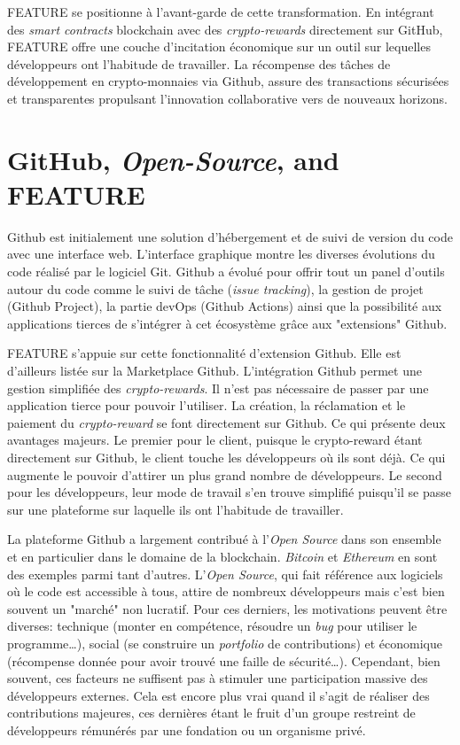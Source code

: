 \documentclass[
	a4paper, %
	10pt, %
	unnumberedsections, %
	twoside, %
]{LTJournalArticle}
\begin{document}
FEATURE se positionne à l'avant-garde de cette transformation. En intégrant des \emph{smart contracts} blockchain avec des \emph{crypto-rewards} directement sur GitHub, FEATURE offre une couche d'incitation économique sur un outil sur lequelles développeurs ont l'habitude de travailler. La récompense des tâches de développement en crypto-monnaies via Github, assure des transactions sécurisées et transparentes propulsant l'innovation collaborative vers de nouveaux horizons.


\section{GitHub, \emph{Open-Source}, and FEATURE}

Github est initialement une solution d'hébergement et de suivi de version du code avec une interface web. L'interface graphique montre les diverses évolutions du code réalisé par le logiciel Git. Github a évolué pour offrir tout un panel d'outils autour du code comme le suivi de tâche (\emph{issue tracking}), la gestion de projet (Github Project), la partie devOps (Github Actions) ainsi que la possibilité aux applications tierces de s'intégrer à cet écosystème grâce aux "extensions" Github.

FEATURE s'appuie sur cette fonctionnalité d'extension Github. Elle est d'ailleurs listée sur la Marketplace Github. L'intégration Github permet une gestion simplifiée des \emph{crypto-rewards}. Il n'est pas nécessaire de passer par une application tierce pour pouvoir l'utiliser. La création, la réclamation et le paiement du \emph{crypto-reward} se font directement sur Github. Ce qui présente deux avantages majeurs. Le premier pour le client, puisque le crypto-reward étant directement sur Github, le client touche les développeurs où ils sont déjà. Ce qui augmente le pouvoir d'attirer un plus grand nombre de développeurs. Le second pour les développeurs, leur mode de travail s'en trouve simplifié puisqu'il se passe sur une plateforme sur laquelle ils ont l'habitude de travailler.

La plateforme Github a largement contribué à l'\emph{Open Source} dans son ensemble et en particulier dans le domaine de la blockchain. \emph{Bitcoin} et \emph{Ethereum} en sont des exemples parmi tant d'autres. L'\emph{Open Source}, qui fait référence aux logiciels où le code est accessible à tous, attire de nombreux développeurs mais c'est bien souvent un "marché" non lucratif. Pour ces derniers, les motivations peuvent être diverses: technique (monter en compétence, résoudre un \emph{bug} pour utiliser le programme\ldots), social (se construire un \emph{portfolio} de contributions) et économique (récompense donnée pour avoir trouvé une faille de sécurité\ldots). Cependant, bien souvent, ces facteurs ne suffisent pas à stimuler une participation massive des développeurs externes. Cela est encore plus vrai quand il s'agit de réaliser des contributions majeures, ces dernières étant le fruit d'un groupe restreint de développeurs rémunérés par une fondation
ou un organisme privé.
\end{document}
